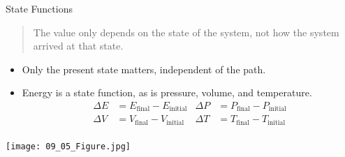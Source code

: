 \documentclass[11pt,letterpaper]{article}
\begin{document}

	
\begin{frame}{State Functions}
	\begin{quote}
		The value only depends on the state of the system, not how the
		system arrived at that state.
	\end{quote}
	\begin{itemize}
		\item Only the present state matters, independent of the path.
		\item Energy is a state function, as is pressure, volume, and
			temperature.
			\begin{align*}
				\Delta E &= E_\text{final} - E_\text{initial} &
				\Delta P &= P_\text{final} - P_\text{initial} \\
				\Delta V &= V_\text{final} - V_\text{initial} &
				\Delta T &= T_\text{final} - T_\text{initial} \\
			\end{align*}
	\end{itemize}

	\begin{center}
		\texttt{[image: 09\_05\_Figure.jpg]}
	\end{center}
\end{frame}

%
\end{document}
